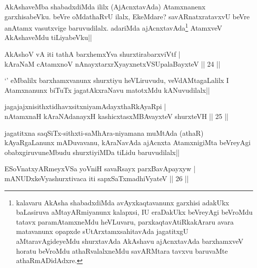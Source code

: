 \begin{artha}
AkAshaveMba shabadxdiMda ililx (AjAcnxtavAda) Atamxnanenx garxhisabeVku. beVre oMdathaRvU ilalx, EkeMdare? savARnatxratavxvU beVre anAtamx vasutxvige baruvudilalx. adariMda ajAcnxtavAda\footnote[1]{kalavaru AkAsha shabadxdiMda avAyxkaqtavanunx garxhisi adakUkx baLasiruva aMtayARmiyanunx kalapxsi, IU eraDakUkx beVreyAgi beVroMdu tatavx paramAtamxneMdu heVLuvaru, parxkaqtavAtiRkakAraru avara matavanunx opapxde sUtArxtamxsahitavAda jagatitxgU aMtaravAgideyeMdu shurxtavAda AkAshavu ajAcnxtavAda barxhamxveV horatu beVroMdu athaRvalalxneMdu savARMtara tavxvu baruvaMte athaRmADidAdxre.} AtamxveV AkAshaveMdu tiLiyabeVku||
\end{artha}


\begin{shl}
AkAshoV vA iti tathA barxhemxYva shurxtirabarxviVtf |\\
kAraNaM cA\s \s tamxnoV nAnayxtarxrXyayxnetxVSUpalaBayxteV \hfill || 24 ||
\end{shl}

\begin{artha}
`\stext ' eMbalilx barxhamxvanunx shurxtiyu heVLiruvudu, veVdAMtagaLalilx I Atamxnanunx biTuTx jagatAkxraNavu matotxMdu kANuvudilalx||
\end{artha}


\begin{shl}
jagajajxnisithxtidhavxsitxniyamAdayxthaRkAyaRpi |\\
nA\s \s tamxnaH kAraNAdanayxH kashicxtasxMBAvayxteV shurxteVH \hfill || 25 ||
\end{shl}

\begin{artha}
jagatitxna saqSiTx-sithxti-saMhAra-niyamana muMtAda (athaR) kAyaRgaLanunx mADuvavanu, kAraNavAda ajAcnxta AtamxnigiMta beVreyAgi obabxgiruvuneMbudu shurxtiyiMDa tiLidu baruvudilalx||
\end{artha}


\begin{shl}
ESoV\s natxyARmeyxVSa yoVniH savaRsayx parxBavApayxyw |\\
mANUDxkeVyashurxtivaca iti sapxSaTxmadhiVyateV \hfill || 26 ||
\end{shl}

